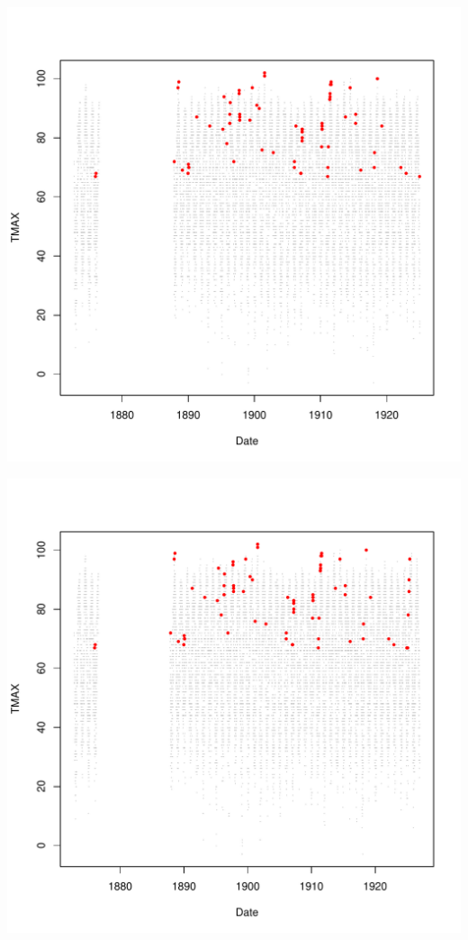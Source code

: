 \documentclass{article}\usepackage[]{graphicx}\usepackage[]{color}
\makeatletter
\def\maxwidth{ %
  \ifdim\Gin@nat@width>\linewidth
    \linewidth
  \else
    \Gin@nat@width
  \fi
}
\newenvironment{knitrout}{}{} %
\makeatother
\begin{document}
\begin{knitrout}
\includegraphics[width=\maxwidth]{figure/unnamed-chunk-4-22} 

\includegraphics[width=\maxwidth]{figure/unnamed-chunk-4-23} 


\end{knitrout}
\end{document}
